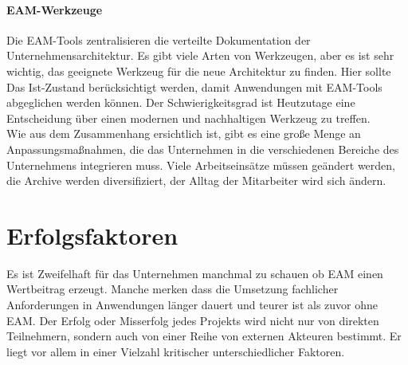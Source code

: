 \documentclass[
	A4paper,
	DIV=9,
	BCOR7mm,
	smallheadings,
	headinclude,
	footinclude,
	headsepline,
	parindent,
	german,
	captions=tableheading,
	abstracton
	]{scrreprt}
\begin{document}
\paragraph{EAM-Werkzeuge}
Die EAM-Tools zentralisieren die verteilte Dokumentation der Unternehmensarchitektur. Es gibt viele Arten von Werkzeugen, aber es ist sehr wichtig, das geeignete Werkzeug für die neue Architektur zu finden. Hier sollte Das Ist-Zustand berücksichtigt werden, damit Anwendungen mit EAM-Tools abgeglichen werden können. Der Schwierigkeitsgrad ist Heutzutage eine Entscheidung über einen modernen und nachhaltigen Werkzeug zu treffen.
\mbox{}\\

Wie aus dem Zusammenhang ersichtlich ist, gibt es eine große Menge an Anpassungsmaßnahmen, die das Unternehmen in die verschiedenen Bereiche des Unternehmens integrieren muss. Viele Arbeitseinsätze müssen geändert werden, die Archive werden diversifiziert, der Alltag der Mitarbeiter wird sich ändern.

\section{Erfolgsfaktoren}
Es ist Zweifelhaft für das Unternehmen manchmal zu schauen ob EAM  einen Wertbeitrag erzeugt. Manche merken dass die Umsetzung fachlicher Anforderungen in Anwendungen länger dauert und teurer ist als zuvor ohne EAM.
Der Erfolg oder Misserfolg jedes Projekts wird nicht nur von direkten Teilnehmern, sondern auch von einer Reihe von externen Akteuren bestimmt. Er  liegt vor allem in einer Vielzahl kritischer unterschiedlicher Faktoren.
\end{document}

